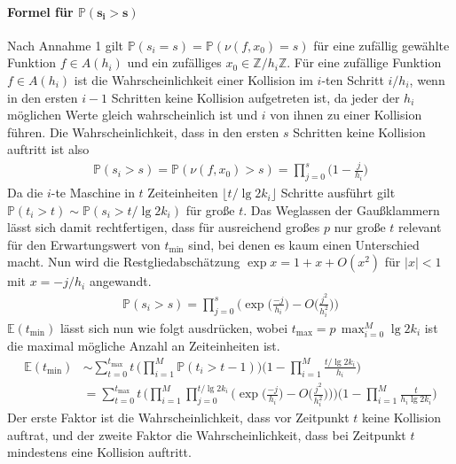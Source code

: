 \documentclass[a4paper, 10pt, ngerman]{article}
\newcommand{\E}{\mathbb{E}}
\newcommand{\Z}{\mathbb{Z}}
\renewcommand{\P}{\mathbb{P}}
\begin{document}
\paragraph{Formel für $\pmb{\P(s_i > s)}$} Nach Annahme 1 gilt $\P(s_i = s) = \P(\nu(f, x_0) = s)$ für eine zufällig gewählte Funktion $f \in A(h_i)$ und ein zufälliges $x_0 \in \Z/h_i\Z$. Für eine zufällige Funktion $f \in A(h_i)$ ist die Wahrscheinlichkeit einer Kollision im $i$-ten Schritt $i/h_i$, wenn in den ersten $i-1$ Schritten keine Kollision aufgetreten ist, da jeder der $h_i$ möglichen Werte gleich wahrscheinlich ist und $i$ von ihnen zu einer Kollision führen. Die Wahrscheinlichkeit, dass in den ersten $s$ Schritten keine Kollision auftritt ist also
\begin{align*}
    \P(s_i > s) = \P(\nu(f, x_0) > s) = \prod_{j = 0}^s \bigg (1 - \frac {j} {h_i} \bigg )
\end{align*}
Da die $i$-te Maschine in $t$ Zeiteinheiten $\lfloor t / \lg 2k_i \rfloor$ Schritte ausführt gilt $\P(t_i > t) \sim \P(s_i > t / \lg 2k_i)$ für große $t$. Das Weglassen der Gaußklammern lässt sich damit rechtfertigen, dass für ausreichend großes $p$ nur große $t$ relevant für den Erwartungswert von $t_{\min}$ sind, bei denen es kaum einen Unterschied macht. Nun wird die Restgliedabschätzung $\exp x = 1 + x + O(x^2)$ für $|x| < 1$ mit $x = -j/h_i$ angewandt.
\begin{align}
    \P(s_i > s) = \prod_{j = 0}^{s} \Bigg ( \exp \bigg ( \frac {-j}{h_i} \bigg ) - O \bigg ( \frac {j^2} {h_i^2} \bigg ) \Bigg )
    \label{ps}
\end{align}
$\E(t_{\min})$ lässt sich nun wie folgt ausdrücken, wobei $t_{\max} = p \, \max_{i = 0}^M \lg 2k_i$ ist die maximal mögliche Anzahl an Zeiteinheiten ist.
\begin{align}
    \E(t_{\min})
     & \sim \sum_{t = 0}^{t_{\max}} t \, \Bigg ( \prod_{i = 1}^M \P(t_i > t - 1) \Bigg ) \Bigg (1 - \prod_{i = 1}^M \frac {t / \lg 2k_i} {h_i} \Bigg ) \nonumber                                                                                                         \\
     & = \sum_{t = 0}^{t_{\max}} t \, \Bigg ( \prod_{i = 1}^M \prod_{j = 0}^{t / \lg 2k_i} \Bigg ( \exp \bigg ( \frac {-j}{h_i} \bigg ) - O \bigg ( \frac {j^2} {h_i^2} \bigg ) \Bigg )\Bigg ) \Bigg (1 - \prod_{i = 1}^M \frac {t} {h_i \lg 2k_i} \Bigg ) \label{etmin}
\end{align}
Der erste Faktor ist die Wahrscheinlichkeit, dass vor Zeitpunkt $t$ keine Kollision auftrat, und der zweite Faktor die Wahrscheinlichkeit, dass bei Zeitpunkt $t$ mindestens eine Kollision auftritt.
\end{document}
